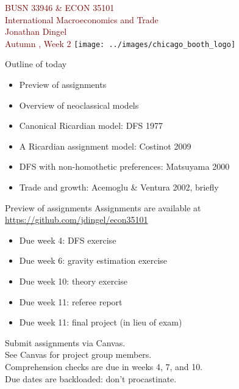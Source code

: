\documentclass[10pt,notes=hide]{beamer}
\begin{document}
\begin{frame}[plain]
\begin{center}
\large
\textcolor{maroon}{BUSN 33946 \& ECON 35101\\
International Macroeconomics and Trade\\ 
Jonathan Dingel\\
Autumn \the\year, Week 2}
\vfill 
\texttt{[image: ../images/chicago\_booth\_logo]}
\end{center}
\end{frame}
\begin{frame}{Outline of today}
\begin{itemize}
	\item Preview of assignments
	\item Overview of neoclassical models
	\item Canonical Ricardian model: DFS 1977
	\item A Ricardian assignment model: Costinot 2009
	\item DFS with non-homothetic preferences: Matsuyama 2000
	\item Trade and growth: Acemoglu \& Ventura 2002, briefly
\end{itemize}
\end{frame}
\begin{frame}{Preview of assignments}
Assignments are available at \url{https://github.com/jdingel/econ35101}
\begin{itemize}
	\item Due week 4: DFS exercise
	\item Due week 6: gravity estimation exercise
	\item Due week 10: theory exercise
	\item Due week 11: referee report
	\item Due week 11: final project (in lieu of exam)
\end{itemize}
Submit assignments via Canvas.\\
See Canvas for project group members.\\
Comprehension checks are due in weeks 4, 7, and 10.\\
Due dates are backloaded: don't procastinate.
\end{frame}
\end{document}

